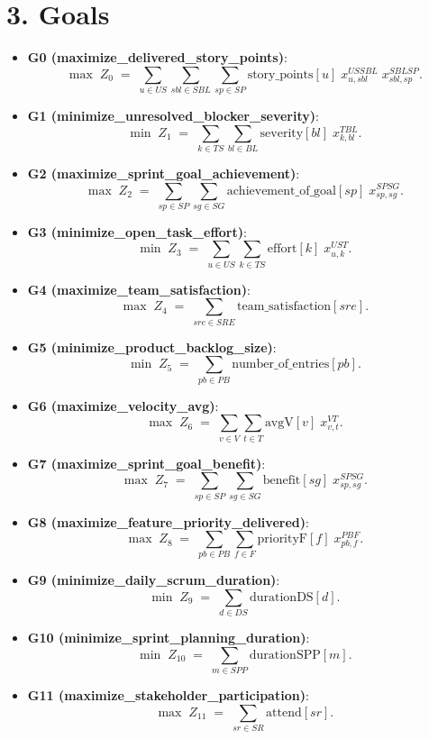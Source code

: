 \documentclass[11pt,a4paper]{article}
\begin{document}
\section{3. Goals}
\begin{itemize}
  \item \textbf{G0 (maximize\_delivered\_story\_points)}:
  \[
    \max \; Z_0 \;=\; \sum_{u\in US}\sum_{sbl\in SBL}\sum_{sp\in SP} \text{story\_points}[u]\; x^{US\!SBL}_{u,sbl}\; x^{SBL\!SP}_{sbl,sp}.
  \]
  \item \textbf{G1 (minimize\_unresolved\_blocker\_severity)}:
  \[
    \min \; Z_1 \;=\; \sum_{k\in TS}\sum_{bl\in BL} \text{severity}[bl]\; x^{T\!BL}_{k,bl}.
  \]
  \item \textbf{G2 (maximize\_sprint\_goal\_achievement)}:
  \[
    \max \; Z_2 \;=\; \sum_{sp\in SP}\sum_{sg\in SG} \text{achievement\_of\_goal}[sp]\; x^{SP\!SG}_{sp,sg}.
  \]
  \item \textbf{G3 (minimize\_open\_task\_effort)}:
  \[
    \min \; Z_3 \;=\; \sum_{u\in US}\sum_{k\in TS} \text{effort}[k]\; x^{US\!T}_{u,k}.
  \]
  \item \textbf{G4 (maximize\_team\_satisfaction)}:
  \[
    \max \; Z_4 \;=\; \sum_{sre\in SRE} \text{team\_satisfaction}[sre].
  \]
  \item \textbf{G5 (minimize\_product\_backlog\_size)}:
  \[
    \min \; Z_5 \;=\; \sum_{pb\in PB} \text{number\_of\_entries}[pb].
  \]
  \item \textbf{G6 (maximize\_velocity\_avg)}:
  \[
    \max \; Z_6 \;=\; \sum_{v\in V}\sum_{t\in T} \text{avgV}[v]\; x^{V\!T}_{v,t}.
  \]
  \item \textbf{G7 (maximize\_sprint\_goal\_benefit)}:
  \[
    \max \; Z_7 \;=\; \sum_{sp\in SP}\sum_{sg\in SG} \text{benefit}[sg]\; x^{SP\!SG}_{sp,sg}.
  \]
  \item \textbf{G8 (maximize\_feature\_priority\_delivered)}:
  \[
    \max \; Z_8 \;=\; \sum_{pb\in PB}\sum_{f\in F} \text{priorityF}[f]\; x^{PB\!F}_{pb,f}.
  \]
  \item \textbf{G9 (minimize\_daily\_scrum\_duration)}:
  \[
    \min \; Z_9 \;=\; \sum_{d\in DS} \text{durationDS}[d].
  \]
  \item \textbf{G10 (minimize\_sprint\_planning\_duration)}:
  \[
    \min \; Z_{10} \;=\; \sum_{m\in SPP} \text{durationSPP}[m].
  \]
  \item \textbf{G11 (maximize\_stakeholder\_participation)}:
  \[
    \max \; Z_{11} \;=\; \sum_{sr\in SR} \text{attend}[sr].
  \]
\end{itemize}
\end{document}
